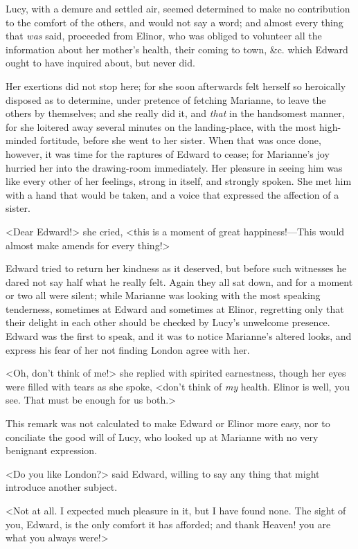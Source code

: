 Lucy, with a demure and settled air, seemed determined to make no contribution to the comfort of the others, and would not say a word; and almost every thing that \textit{was} said, proceeded from Elinor, who was obliged to volunteer all the information about her mother's health, their coming to town, \&c. which Edward ought to have inquired about, but never did.

Her exertions did not stop here; for she soon afterwards felt herself so heroically disposed as to determine, under pretence of fetching Marianne, to leave the others by themselves; and she really did it, and \textit{that} in the handsomest manner, for she loitered away several minutes on the landing-place, with the most high-minded fortitude, before she went to her sister. When that was once done, however, it was time for the raptures of Edward to cease; for Marianne's joy hurried her into the drawing-room immediately. Her pleasure in seeing him was like every other of her feelings, strong in itself, and strongly spoken. She met him with a hand that would be taken, and a voice that expressed the affection of a sister.

<Dear Edward!> she cried, <this is a moment of great happiness!—This would almost make amends for every thing!>

Edward tried to return her kindness as it deserved, but before such witnesses he dared not say half what he really felt. Again they all sat down, and for a moment or two all were silent; while Marianne was looking with the most speaking tenderness, sometimes at Edward and sometimes at Elinor, regretting only that their delight in each other should be checked by Lucy's unwelcome presence. Edward was the first to speak, and it was to notice Marianne's altered looks, and express his fear of her not finding London agree with her.

<Oh, don't think of me!> she replied with spirited earnestness, though her eyes were filled with tears as she spoke, <don't think of \textit{my} health. Elinor is well, you see. That must be enough for us both.>

This remark was not calculated to make Edward or Elinor more easy, nor to conciliate the good will of Lucy, who looked up at Marianne with no very benignant expression.

<Do you like London?> said Edward, willing to say any thing that might introduce another subject.

<Not at all. I expected much pleasure in it, but I have found none. The sight of you, Edward, is the only comfort it has afforded; and thank Heaven! you are what you always were!>

